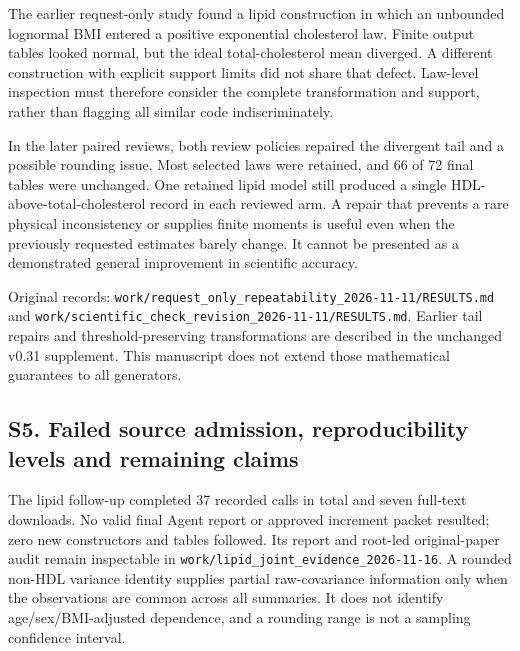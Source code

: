 \documentclass[11pt,letterpaper]{article}
\begin{document}
The earlier request-only study found a lipid construction in which an unbounded lognormal BMI entered a positive exponential cholesterol law. Finite output tables looked normal, but the ideal total-cholesterol mean diverged. A different construction with explicit support limits did not share that defect. Law-level inspection must therefore consider the complete transformation and support, rather than flagging all similar code indiscriminately.


In the later paired reviews, both review policies repaired the divergent tail and a possible rounding issue. Most selected laws were retained, and 66 of 72 final tables were unchanged. One retained lipid model still produced a single HDL-above-total-cholesterol record in each reviewed arm. A repair that prevents a rare physical inconsistency or supplies finite moments is useful even when the previously requested estimates barely change. It cannot be presented as a demonstrated general improvement in scientific accuracy.


Original records: \texttt{work/\allowbreak{}request\_\allowbreak{}only\_\allowbreak{}repeatability\_\allowbreak{}2026-\allowbreak{}11-\allowbreak{}11/\allowbreak{}RESULTS.md} and \texttt{work/\allowbreak{}scientific\_\allowbreak{}check\_\allowbreak{}revision\_\allowbreak{}2026-\allowbreak{}11-\allowbreak{}11/\allowbreak{}RESULTS.md}. Earlier tail repairs and threshold-preserving transformations are described in the unchanged v0.31 supplement. This manuscript does not extend those mathematical guarantees to all generators.


\subsection*{S5. Failed source admission, reproducibility levels and remaining claims}

The lipid follow-up completed 37 recorded calls in total and seven full-text downloads. No valid final Agent report or approved increment packet resulted; zero new constructors and tables followed. Its report and root-led original-paper audit remain inspectable in \texttt{work/\allowbreak{}lipid\_\allowbreak{}joint\_\allowbreak{}evidence\_\allowbreak{}2026-\allowbreak{}11-\allowbreak{}16}. A rounded non-HDL variance identity supplies partial raw-covariance information only when the observations are common across all summaries. It does not identify age/\allowbreak{}sex/\allowbreak{}BMI-adjusted dependence, and a rounding range is not a sampling confidence interval.
\end{document}
